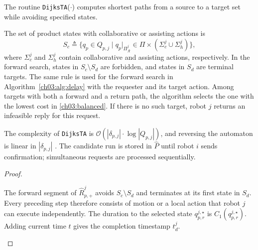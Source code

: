  The routine \texttt{DijksTA}($\cdot$) computes
shortest paths from a source to a target set while avoiding specified states.
\begin{revision}
The set of product states with collaborative or assisting actions is
\begin{equation}
\label{ch03:eq:Sc}
S_c \triangleq
\{q_p \in Q_{p,j} \mid
 q_p|_{\Pi_{\mathcal{R}}^j} \in \Pi \times (\Sigma_c^j \cup \Sigma_h^j)\},
\end{equation}
where $\Sigma_c^j$ and $\Sigma_h^j$ contain collaborative and assisting
actions, respectively. In the forward search, states in $S_c\setminus S_d$ are
forbidden, and states
in $S_d$ are terminal targets. The same rule is used for the forward search
in Algorithm~\ref{ch03:alg:delay} with the requester and its target action.
Among targets with both a forward and a return path, the algorithm selects the
one with the lowest cost in \eqref{ch03:balanced}. If there is no such target,
robot $j$ returns an infeasible reply for this request.
\end{revision}
The complexity of \texttt{DijksTA} is
$\mathcal{O}(|\delta_{p,j}| \cdot \log |Q_{p,j}|)$, and reversing the automaton
is linear in $|\delta_{p,j}|$
\citep{baier2008principles,lavalle2006planning,korf1987planning}. The candidate
run is stored in $\widehat{P}$ until robot $i$ sends confirmation; simultaneous
requests are processed sequentially.

\begin{lemma}
\label{ch03:td}
\end{lemma}

\begin{proof}
\begin{revision}
The forward segment of $\widehat{R}_{p,+}^j$ avoids $S_c\setminus S_d$ and
terminates at its first state in $S_d$. Every preceding step therefore
consists of motion or a local action that robot $j$ can execute independently.
The duration to the selected state $q_{p,r}^{j,\star}$ is $C_1(q_{p,r}^{j,\star})$.
Adding current time $t$ gives the completion timestamp $t_d^j$.
\end{revision}
\end{proof}



